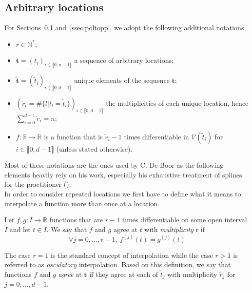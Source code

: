 \subsection{Arbitrary locations}\label{ssec:arbitrary} For Sections~\ref{ssec:arbitrary} and~\ref{ssec:poltopp}, we 
adopt the following additional notations
\begin{itemize}
  \itemsep0em
  \item $r \in \mathbb{N}^*$;
  \item $\bm{t} = {(t_i)}_{i\in \llbracket0,n-1\rrbracket}$ a sequence of arbitrary locations;
  \item $\bm{\tilde{t}} = {(\tilde{t}_i)}_{i\in \llbracket0,d-1\rrbracket}$ unique elements of the sequence $\bm{t}$;
  \item ${(\tilde{r}_i = \#\{l | t_l = \tilde{t}_i\})}_{i\in \llbracket0,d-1\rrbracket}$ the multiplicities of each 
    unique location, hence $\displaystyle\sum_{i=0}^{d-1} \tilde{r}_i = n$;
  \item $f: \mathbb{R} \to \mathbb{R}$ is a function that is $\tilde{r}_{i}-1$ times differentiable in 
    $\mathcal{V}(\tilde{t}_i)$ for $i \in \llbracket0,d-1\rrbracket$ (unless stated otherwise).
\end{itemize}
Most of these notations are the ones used by C. De Boor as the following elements heavily rely on his work, especially 
his exhaustive treatment of splines for the practitioner (\cite{de_boor_practical_2001}). \\ 

In order to consider repeated locations we first have to define what it means to interpolate a function more than once 
at a location. 

\begin{deftn} Let $f, g: I \to \mathbb{R}$ 
  functions that are $r-1$ times differentiable on some open interval $I$ and let $t \in I$. We say that $f$ and $g$ 
  agree at $t$ with \emph{multiplicity} r if
  \begin{equation}
    \forall j=0, \ldots, r-1, \ f^{(j)}(t) = g^{(j)}(t)
  \end{equation}
\end{deftn}

The case $r=1$ is the standard concept of interpolation while the case $r > 1$ is referred to as \emph{osculatory} 
interpolation. Based on this definition, we say that functions $f$ and $g$ \emph{agree} at $\bm{t}$ if they agree at 
each of $\tilde{t}_j$ with multiplicity $\tilde{r}_j$ for $j=0, \ldots, d-1$.\\


